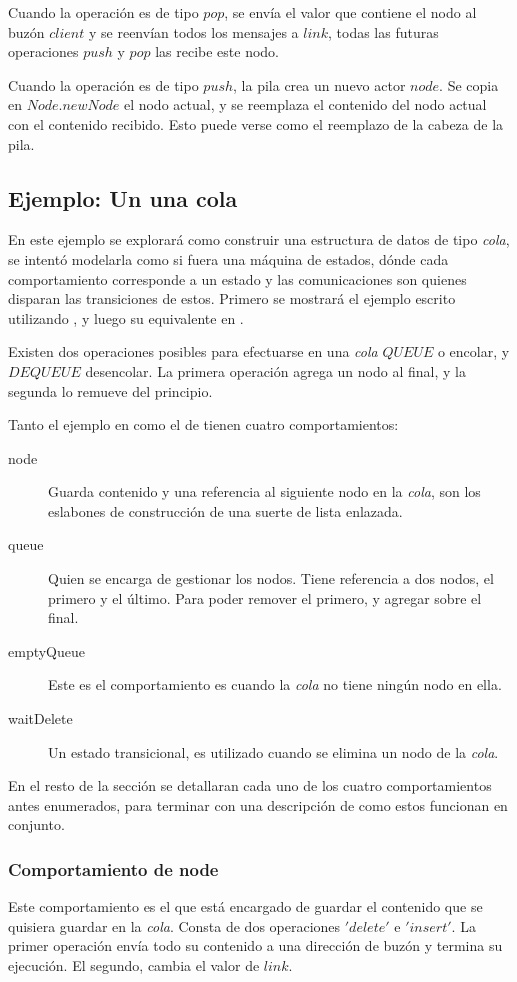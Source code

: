 Cuando la operación es de tipo $pop$, se envía el valor que contiene el nodo al buzón $client$ y se reenvían todos los mensajes a $link$, todas las futuras operaciones $push$ y $pop$ las recibe este nodo.

Cuando la operación es de tipo $push$, la pila crea un nuevo actor $node$. Se copia en $Node.newNode$ el nodo actual, y se reemplaza el contenido del nodo actual con el contenido recibido. Esto puede verse como el reemplazo de la cabeza de la pila.

\subsection{Ejemplo: Un una cola}

En este ejemplo se explorará como construir una estructura de datos de tipo \textit{cola}, se intentó modelarla como si fuera una máquina de estados, dónde cada comportamiento corresponde a un estado y las comunicaciones son quienes disparan las transiciones de estos. Primero se mostrará el ejemplo escrito utilizando \SAL, y luego su equivalente en \CSP.

Existen dos operaciones posibles para efectuarse en una \textit{cola} $QUEUE$ o encolar, y $DEQUEUE$ desencolar. La primera operación agrega un nodo al final, y la segunda lo remueve del principio. 

Tanto el ejemplo en \SAL como el de \CSP tienen cuatro comportamientos:

\begin{description}
 \item [node] Guarda contenido y una referencia al siguiente nodo en la \textit{cola}, son los eslabones de construcción de una suerte de lista enlazada.
 \item [queue] Quien se encarga de gestionar los nodos. Tiene referencia a dos nodos, el primero y el último. Para poder remover el primero, y agregar sobre el final.
 \item [emptyQueue] Este es el comportamiento es cuando la \textit{cola} no tiene ningún nodo en ella.
 \item [waitDelete] Un estado transicional, es utilizado cuando se elimina un nodo de la \textit{cola}.
\end{description}

En el resto de la sección se detallaran cada uno de los cuatro comportamientos antes enumerados, para terminar con una descripción de como estos funcionan en conjunto.

\subsubsection*{Comportamiento de node}
Este comportamiento es el que está encargado de guardar el contenido que se quisiera guardar en la \textit{cola}. Consta de dos operaciones $'delete'$ e $'insert'$. La primer operación envía todo su contenido a una dirección de buzón y termina su ejecución. El segundo, cambia el valor de $link$.

